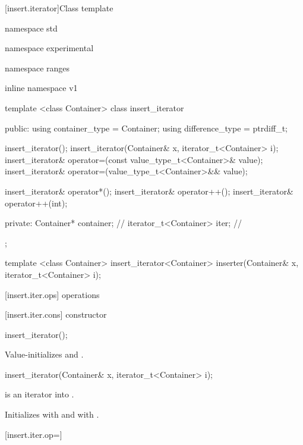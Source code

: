 [insert.iterator]{Class template }

%
\begin{codeblock}
namespace std { namespace experimental { namespace ranges { inline namespace v1 {
  template <class Container>
  class insert_iterator {
  public:
    using container_type = Container;
    using difference_type = ptrdiff_t;

    insert_iterator();
    insert_iterator(Container& x, iterator_t<Container> i);
    insert_iterator&
      operator=(const value_type_t<Container>& value);
    insert_iterator&
      operator=(value_type_t<Container>&& value);

    insert_iterator& operator*();
    insert_iterator& operator++();
    insert_iterator& operator++(int);

  private:
    Container* container;       // \expos
    iterator_t<Container> iter; // \expos
  };

  template <class Container>
    insert_iterator<Container> inserter(Container& x, iterator_t<Container> i);
}}}}
\end{codeblock}

[insert.iter.ops]{ operations}

[insert.iter.cons]{ constructor}

%
\begin{itemdecl}
insert_iterator();
\end{itemdecl}

\begin{itemdescr}
\pnum
\effects
Value-initializes
 and .
\end{itemdescr}

%
\begin{itemdecl}
insert_iterator(Container& x, iterator_t<Container> i);
\end{itemdecl}

\begin{itemdescr}
\pnum
\requires
{} is an iterator into .

\pnum
\effects
Initializes
with  and
with .
\end{itemdescr}

[insert.iter.op=]{}

